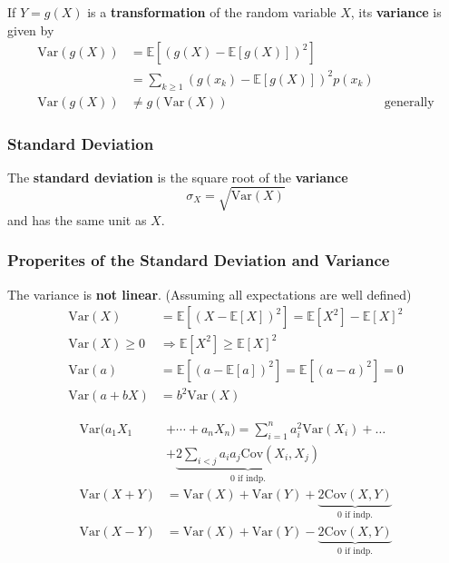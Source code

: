 \newpar{}
If $Y=g(X)$ is a \textbf{transformation} of the random variable $X$, its \textbf{variance} is given by
\noindent\begin{align*}
    \mathrm{Var}(g(X)) & =\mathbb{E}[{(g(X)-\mathbb{E}[g(X)])}^{2}]                                 \\
                       & =\sum_{k\geq1}{(g(x_{k})-\mathbb{E}[g(X)])}^{2}p(x_{k})                    \\
    \mathrm{Var}(g(X)) & \neq g(\mathrm{Var}(X))                                 & \text{generally}
\end{align*}

\subsubsection{Standard Deviation}
The \textbf{standard deviation} is the square root of the \textbf{variance}
\noindent\begin{equation*}
    \sigma_{X}=\sqrt{\mathrm{Var}(X)}
\end{equation*}
and has the same unit as $X$.

\subsubsection{Properites of the Standard Deviation and Variance}
The variance is \textbf{not linear}. (Assuming all expectations are well defined)
\noindent\begin{align*}
    \mathrm{Var}(X)      & =\mathbb{E}[{(X-\mathbb{E}[X])}^2] = \mathbb{E}[X^2]-{\mathbb{E}[X]}^2 \\
    \mathrm{Var}(X)\geq0 & \Rightarrow\mathbb{E}[X^{2}]\geq{\mathbb{E}[X]}^{2}                    \\
    \mathrm{Var}(a)      & =\mathbb{E}[{(a-\mathbb{E}[a])}^2]=\mathbb{E}[{(a-a)}^2]=0             \\
    \mathrm{Var}(a+bX)   & = b^2\mathrm{Var}(X)
\end{align*}

\noindent\begin{align*}
    \mathrm{Var}(a_1X_1 & +\cdots+a_n X_n)  =\sum_{i=1}^{n}a_{i}^{2}\mathrm{Var}(X_{i})+\ldots                  \\
                        & + \underbrace{2\sum_{i<j}a_{i}a_{j}\mathrm{Cov}(X_{i},X_{j})}_{0\text{ if indp.}}     \\
    \mathrm{Var}(X+Y)   & =\mathrm{Var}(X)+\mathrm{Var}(Y)+ \underbrace{2\mathrm{Cov}(X,Y)}_{0\text{ if indp.}} \\
    \mathrm{Var}(X-Y)   & =\mathrm{Var}(X)+\mathrm{Var}(Y)-\underbrace{2\mathrm{Cov}(X,Y)}_{0\text{ if indp.}}
\end{align*}

